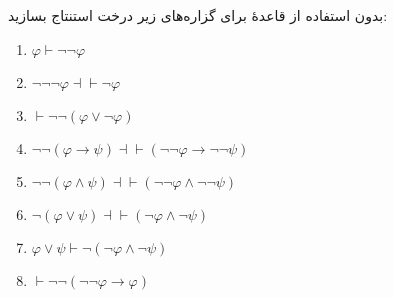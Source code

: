 بدون استفاده از قاعدهٔ  برای گزاره‌های زیر درخت استنتاج بسازید:
\begin{enumerate}[label=(\alph*)]
    \item $\varphi\vdash\neg\neg\varphi$
    \item $\neg\neg\neg\varphi\dashv\vdash\neg\varphi$
    \item $\vdash\neg\neg(\varphi\vee\neg\varphi)$
    \item $\neg\neg(\varphi\to\psi)\dashv\vdash(\neg\neg\varphi\to\neg\neg\psi)$
    \item $\neg\neg(\varphi\wedge\psi)\dashv\vdash(\neg\neg\varphi\wedge\neg\neg\psi)$
    \item $\neg(\varphi\vee\psi)\dashv\vdash(\neg\varphi\wedge\neg\psi)$
    \item $\varphi\vee\psi\vdash\neg(\neg\varphi\wedge\neg\psi)$
    \item $\vdash\neg\neg(\neg\neg\varphi\to\varphi)$
\end{enumerate}\quad\vspace{-1cm}
